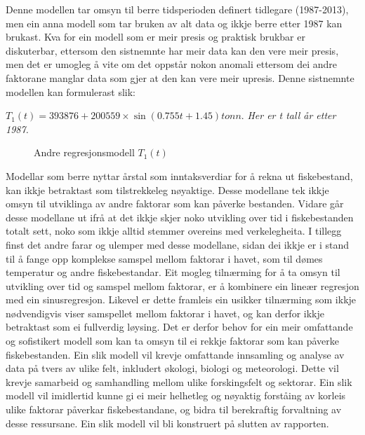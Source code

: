 \documentclass{report}
\begin{document}
Denne modellen tar omsyn til berre tidsperioden definert tidlegare (1987-2013), men ein anna modell som tar bruken av alt data og ikkje berre etter 1987 kan brukast.
Kva for ein modell som er meir presis og praktisk brukbar er diskuterbar, ettersom den sistnemnte har meir data kan den vere meir presis, men det er umogleg å vite om det oppstår nokon anomali ettersom dei andre faktorane manglar data som gjer at den kan vere meir upresis.
Denne sistnemnte modellen kan formulerast slik:
\begin{center}
	$T_{1}(t) = 393876+200559\times \sin(0.755t+1.45)tonn.$
	\textit{Her er t tall år etter 1987.}
\end{center}

\begin{figure}[H]
	\centering
	\caption{Andre regresjonsmodell $T_1(t)$}
	\label{T1}
\end{figure}

Modellar som berre nyttar årstal som inntaksverdiar for å rekna ut fiskebestand, kan ikkje betraktast som tilstrekkeleg nøyaktige. Desse modellane tek ikkje omsyn til utviklinga av andre faktorar som kan påverke bestanden. Vidare går desse modellane ut ifrå at det ikkje skjer noko utvikling over tid i fiskebestanden totalt sett, noko som ikkje alltid stemmer overeins med verkelegheita. I tillegg finst det andre farar og ulemper med desse modellane, sidan dei ikkje er i stand til å fange opp komplekse samspel mellom faktorar i havet, som til dømes temperatur og andre fiskebestandar.
Eit mogleg tilnærming for å ta omsyn til utvikling over tid og samspel mellom faktorar, er å kombinere ein lineær regresjon med ein sinusregresjon. Likevel er dette framleis ein usikker tilnærming som ikkje nødvendigvis viser samspellet mellom faktorar i havet, og kan derfor ikkje betraktast som ei fullverdig løysing.
Det er derfor behov for ein meir omfattande og sofistikert modell som kan ta omsyn til ei rekkje faktorar som kan påverke fiskebestanden. Ein slik modell vil krevje omfattande innsamling og analyse av data på tvers av ulike felt, inkludert økologi, biologi og meteorologi. Dette vil krevje samarbeid og samhandling mellom ulike forskingsfelt og sektorar. Ein slik modell vil imidlertid kunne gi ei meir helhetleg og nøyaktig forståing av korleis ulike faktorar påverkar fiskebestandane, og bidra til berekraftig forvaltning av desse ressursane.
Ein slik modell vil bli konstruert på slutten av rapporten.
\end{document}
